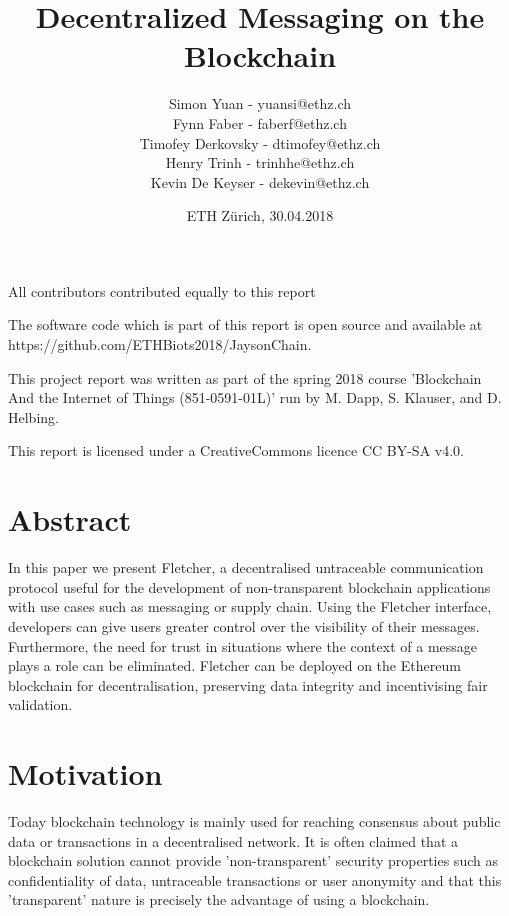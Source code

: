 \documentclass[a4paper]{article} %
\title{Decentralized Messaging on the Blockchain}
\author{Simon Yuan - yuansi@ethz.ch\\ Fynn Faber - faberf@ethz.ch \\
Timofey Derkovsky - dtimofey@ethz.ch \\ Henry Trinh - trinhhe@ethz.ch \\ Kevin De Keyser - dekevin@ethz.ch}
\begin{document}
\date{ETH Zürich, 30.04.2018}
\maketitle

\begin{center}
    All contributors contributed equally to this report
\end{center}

\vspace*{\fill}


\begin{center}
    The software code which is part of this report is open source and available at https://github.com/ETHBiots2018/JaysonChain.
    
    This project report was written as part of the spring 2018 course 'Blockchain And the Internet of Things (851-0591-01L)' run by M. Dapp, S. Klauser, and D. Helbing.
    
    This report is licensed under a CreativeCommons licence CC BY-SA v4.0.
\end{center}

\newpage

\tableofcontents

\newpage
\section{Abstract}
In this paper we present Fletcher, a decentralised untraceable communication protocol useful for the development of non-transparent blockchain applications with use cases such as messaging or supply chain. Using the Fletcher interface, developers can give users greater control over the visibility of their messages. Furthermore, the need for trust in situations where the context of a message plays a role can be eliminated. Fletcher can be deployed on the Ethereum blockchain for decentralisation, preserving data integrity and incentivising fair validation.




\section{Motivation}
Today blockchain technology is mainly used for reaching consensus about public data or transactions in a decentralised network. It is often claimed that a blockchain solution cannot provide 'non-transparent' security properties such as confidentiality of data, untraceable transactions or user anonymity and that this 'transparent' nature is precisely the advantage of using a blockchain.
\end{document}
